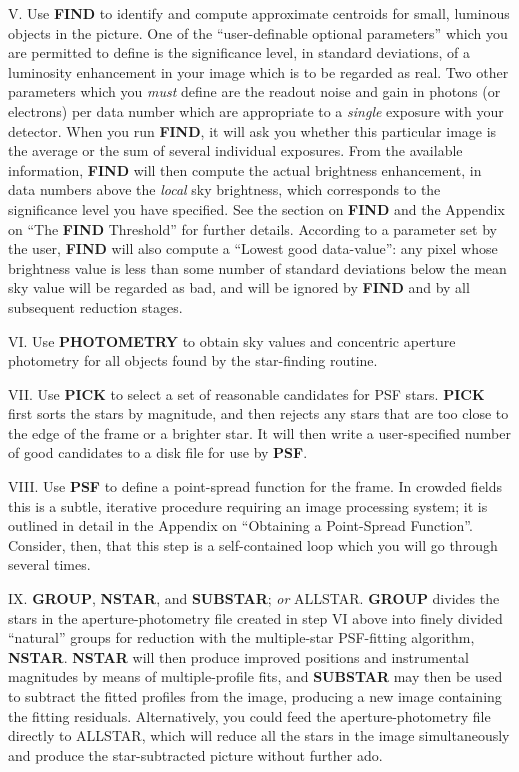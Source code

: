 \item{V.} Use {\bf FIND} to identify and compute approximate centroids
for small, luminous objects in the picture.  One of the
``user-definable optional parameters'' which you are permitted to
define is the significance level, in standard deviations, of a
luminosity enhancement in your image which is to be regarded as real.
Two other parameters which you {\it must\/} define are the readout
noise and gain in photons (or electrons) per data number which are
appropriate to a {\it single\/} exposure with your detector.  When you
run {\bf FIND}, it will ask you whether this particular image is the
average or the sum of several individual exposures.  From the available
information, {\bf FIND} will then compute the actual brightness
enhancement, in data numbers above the {\it local\/} sky brightness,
which corresponds to the significance level you have specified.  See
the section on {\bf FIND} and the Appendix on ``The {\bf FIND}
Threshold'' for further details.  According to a parameter set by the
user, {\bf FIND} will also compute a ``Lowest good data-value'':  any
pixel whose brightness value is less than some number of standard
deviations below the mean sky value will be regarded as bad, and will
be ignored by {\bf FIND} and by all subsequent reduction stages.

\item{VI.} Use {\bf PHOTOMETRY} to obtain sky values and concentric
aperture photometry for all objects found by the star-finding routine.

\item{VII.} Use {\bf PICK} to select a set of reasonable candidates for
PSF stars.  {\bf PICK} first sorts the stars by magnitude, and then
rejects any stars that are too close to the edge of the frame or a
brighter star.  It will then write a user-specified number of good
candidates to a disk file for use by {\bf PSF}.

\item{VIII.} Use {\bf PSF} to define a point-spread function for the
frame.  In crowded fields this is a subtle, iterative procedure
requiring an image processing system; it is outlined in detail in the
Appendix on ``Obtaining a Point-Spread Function''.  Consider, then,
that this step is a self-contained loop which you will go through
several times.

\item{IX.}  {\bf GROUP}, {\bf NSTAR}, and {\bf SUBSTAR}; {\it or\/}
ALLSTAR.  {\bf GROUP} divides the stars in the
aperture-photometry file created in step VI above into finely divided
``natural'' groups for reduction with the multiple-star PSF-fitting
algorithm, \hbox{\bf NSTAR}. {\bf NSTAR} will then produce improved
positions and instrumental magnitudes by means of multiple-profile
fits, and {\bf SUBSTAR} may then be used to subtract the fitted
profiles from the image, producing a new image containing the fitting
residuals.  Alternatively, you could feed the aperture-photometry file
directly to ALLSTAR, which will reduce all the stars in the image
simultaneously and produce the star-subtracted picture without further
ado.

